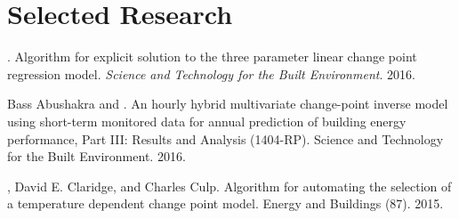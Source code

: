 \documentclass[]{deedy-resume-openfont}
\begin{document}
\begin{minipage}[t]{0.66\textwidth}


\section{Selected Research}

. Algorithm for explicit solution to the three
parameter linear change point regression model. \textit{Science and Technology
for the Built Environment}. 2016.


\sectionsep

Bass Abushakra and . An hourly hybrid
multivariate change-point inverse model using short-term monitored data for
annual prediction of building energy performance, {Part III}: Results and Analysis
({1404-RP}). Science and Technology for the Built Environment. 2016.
\sectionsep

, David E. Claridge, and Charles Culp. Algorithm
for automating the selection of a temperature dependent change point model.
Energy and Buildings (87). 2015.




\end{minipage}
\end{document}
